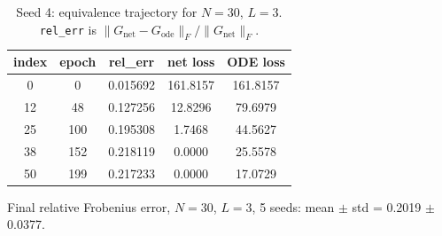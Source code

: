 \begin{table}[H]
\centering
\caption{Seed 4: equivalence trajectory for $N=30$, $L=3$. \texttt{rel\_err} is $\|G_{\mathrm{net}} - G_{\mathrm{ode}}\|_F / \|G_{\mathrm{net}}\|_F$.}
\label{tab:equiv-N30-L3-s4}
\begin{tabular}{c c c c c}
\toprule
index & epoch & rel\_err & net loss & ODE loss \\
\midrule
0 & 0 & 0.015692 & 161.8157 & 161.8157 \\
12 & 48 & 0.127256 & 12.8296 & 79.6979 \\
25 & 100 & 0.195308 & 1.7468 & 44.5627 \\
38 & 152 & 0.218119 & 0.0000 & 25.5578 \\
50 & 199 & 0.217233 & 0.0000 & 17.0729 \\
\bottomrule
\end{tabular}
\end{table}

Final relative Frobenius error, $N=30$, $L=3$, 5 seeds: mean $\pm$ std = 0.2019 $\pm$ 0.0377.
